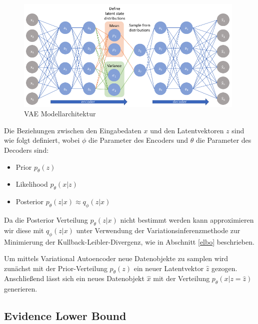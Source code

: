 \begin{figure}[h]
    \centering
    \includegraphics[width=11cm]{bilder/vae}
    \caption{VAE Modellarchitektur}
    \label{vae_model}
\end{figure}
Die Beziehungen zwischen den Eingabedaten $x$ und den Latentvektoren $z$ sind wie folgt definiert, wobei $\phi$ die Parameter des Encoders und $\theta$ die Parameter des Decoders sind:
\begin{itemize}
\item Prior $p_\theta (z)$
\item Likelihood $p_\theta (x|z)$
\item Posterior $p_\theta (z|x)  \approx q_\phi (z|x)$
\end{itemize}

Da die Posterior Verteilung $p_\theta (z|x)$ nicht bestimmt werden kann approximieren wir diese mit $q_\phi (z|x)$ unter Verwendung der Variationsinferenzmethode zur Minimierung der Kullback-Leibler-Divergenz, wie in Abschnitt \ref{elbo} beschrieben.

Um mittels Variational Autoencoder neue Datenobjekte zu samplen wird zunächst mit der Prior-Verteilung $p_\theta (z)$ ein neuer Latentvektor $\hat{z}$ gezogen. Anschließend lässt sich ein neues Datenobjekt $\hat{x}$ mit der Verteilung $p_\theta (x|z=\hat{z})$ generieren.
\subsection{Evidence Lower Bound}

